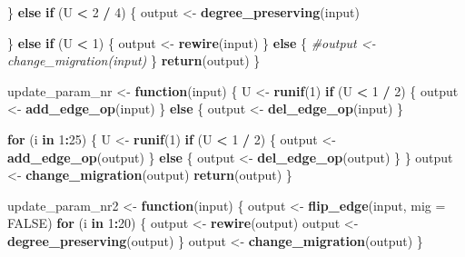\documentclass[11pt,a4paper]{article}
\newenvironment{Shaded}{\begin{snugshade}}{\end{snugshade}}
\newcommand{\CommentTok}[1]{\textcolor[rgb]{0.56,0.35,0.01}{\textit{#1}}}
\newcommand{\ControlFlowTok}[1]{\textcolor[rgb]{0.13,0.29,0.53}{\textbf{#1}}}
\newcommand{\DataTypeTok}[1]{\textcolor[rgb]{0.13,0.29,0.53}{#1}}
\newcommand{\DecValTok}[1]{\textcolor[rgb]{0.00,0.00,0.81}{#1}}
\newcommand{\KeywordTok}[1]{\textcolor[rgb]{0.13,0.29,0.53}{\textbf{#1}}}
\newcommand{\NormalTok}[1]{#1}
\newcommand{\OperatorTok}[1]{\textcolor[rgb]{0.81,0.36,0.00}{\textbf{#1}}}
\newcommand{\OtherTok}[1]{\textcolor[rgb]{0.56,0.35,0.01}{#1}}
\newcommand{\StringTok}[1]{\textcolor[rgb]{0.31,0.60,0.02}{#1}}
\begin{document}
\begin{Shaded}
\begin{Highlighting}[]
\NormalTok{  \} }\ControlFlowTok{else} \ControlFlowTok{if}\NormalTok{ (U }\OperatorTok{<}\StringTok{ }\DecValTok{2} \OperatorTok{/}\StringTok{ }\DecValTok{4}\NormalTok{) \{}
\NormalTok{    output <-}\StringTok{ }\KeywordTok{degree_preserving}\NormalTok{(input)}
    
\NormalTok{  \} }\ControlFlowTok{else} \ControlFlowTok{if}\NormalTok{ (U }\OperatorTok{<}\StringTok{ }\DecValTok{1}\NormalTok{) \{}
\NormalTok{    output <-}\StringTok{ }\KeywordTok{rewire}\NormalTok{(input)}
\NormalTok{  \} }\ControlFlowTok{else}\NormalTok{ \{}
    \CommentTok{#output <- change_migration(input)}
\NormalTok{  \}}
  \KeywordTok{return}\NormalTok{(output)}
\NormalTok{\}}


\NormalTok{update_param_nr <-}\StringTok{ }\ControlFlowTok{function}\NormalTok{(input) \{}
\NormalTok{  U <-}\StringTok{ }\KeywordTok{runif}\NormalTok{(}\DecValTok{1}\NormalTok{)}
  \ControlFlowTok{if}\NormalTok{ (U }\OperatorTok{<}\StringTok{ }\DecValTok{1} \OperatorTok{/}\StringTok{ }\DecValTok{2}\NormalTok{) \{}
\NormalTok{    output <-}\StringTok{ }\KeywordTok{add_edge_op}\NormalTok{(input)}
\NormalTok{  \} }\ControlFlowTok{else}\NormalTok{ \{}
\NormalTok{    output <-}\StringTok{ }\KeywordTok{del_edge_op}\NormalTok{(input)}
\NormalTok{  \}}
  
  \ControlFlowTok{for}\NormalTok{ (i }\ControlFlowTok{in} \DecValTok{1}\OperatorTok{:}\DecValTok{25}\NormalTok{) \{}
\NormalTok{    U <-}\StringTok{ }\KeywordTok{runif}\NormalTok{(}\DecValTok{1}\NormalTok{)}
    \ControlFlowTok{if}\NormalTok{ (U }\OperatorTok{<}\StringTok{ }\DecValTok{1} \OperatorTok{/}\StringTok{ }\DecValTok{2}\NormalTok{) \{}
\NormalTok{      output <-}\StringTok{ }\KeywordTok{add_edge_op}\NormalTok{(output)}
\NormalTok{    \} }\ControlFlowTok{else}\NormalTok{ \{}
\NormalTok{      output <-}\StringTok{ }\KeywordTok{del_edge_op}\NormalTok{(output)}
\NormalTok{    \}}
\NormalTok{  \}}
\NormalTok{  output <-}\StringTok{ }\KeywordTok{change_migration}\NormalTok{(output)}
  \KeywordTok{return}\NormalTok{(output)}
\NormalTok{\}}

\NormalTok{update_param_nr2 <-}\StringTok{ }\ControlFlowTok{function}\NormalTok{(input) \{}
\NormalTok{  output <-}\StringTok{ }\KeywordTok{flip_edge}\NormalTok{(input, }\DataTypeTok{mig =} \OtherTok{FALSE}\NormalTok{)}
  \ControlFlowTok{for}\NormalTok{ (i }\ControlFlowTok{in} \DecValTok{1}\OperatorTok{:}\DecValTok{20}\NormalTok{) \{}
\NormalTok{    output <-}\StringTok{ }\KeywordTok{rewire}\NormalTok{(output)}
\NormalTok{    output <-}\StringTok{ }\KeywordTok{degree_preserving}\NormalTok{(output)}
\NormalTok{  \}}
\NormalTok{  output <-}\StringTok{ }\KeywordTok{change_migration}\NormalTok{(output)}
\NormalTok{\}}
\end{Highlighting}
\end{Shaded}
\end{document}
